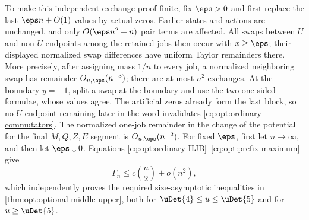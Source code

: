 To make this independent exchange proof finite, fix
$\eps>0$ and first replace the last
$\eps n+O(1)$ values by actual zeros.  Earlier states and
actions are unchanged, and only $O(\eps n^2+n)$ pair terms are
affected.  All swaps between $U$ and non-$U$ endpoints among the retained
jobs then
occur with $x\ge\eps$; their displayed normalized swap differences have
uniform Taylor remainders there.  More precisely, after assigning mass
$1/n$ to every job, a normalized neighboring swap has remainder
$O_{u,\eps}(n^{-3})$; there are at most $n^2$ exchanges.  At the
boundary $y=-1$, split a swap at the boundary and use the two one-sided
formulae, whose values agree.  The artificial zeros already form the
last block, so no $U$-endpoint remaining later in the word invalidates
\eqref{eq:opt:ordinary-commutators}.  The normalized one-job remainder in
the change of the potential for the final $M,Q,Z,E$ segment is
$O_{u,\eps}(n^{-2})$.  For fixed $\eps$, first let
$n\to\infty$, and then let $\eps\downarrow0$.  Equations
\eqref{eq:opt:ordinary-HJB}--\eqref{eq:opt:prefix-maximum} give
\[
 \Gamma_n\le c\binom n2+o(n^2),
\]
which independently proves the required size-asymptotic inequalities in
\cref{thm:opt:optional-middle-upper}, both for
$\uDet{4}\le u\le\uDet{5}$ and for $u\ge\uDet{5}$.
